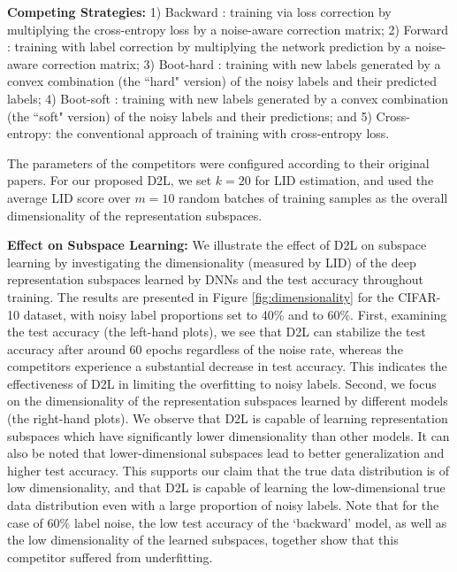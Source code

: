 \documentclass{article}
\begin{document}
\textbf{Competing Strategies:}
1) Backward \cite{patrini2017making}: training via loss correction by multiplying the cross-entropy loss by a noise-aware correction matrix; 2) Forward \cite{patrini2017making}: training with label correction by multiplying the network prediction by a noise-aware correction matrix; 3) Boot-hard \cite{reed2014training}: training with new labels generated by a convex combination (the ``hard" version) of the noisy labels and their predicted labels; 4) Boot-soft \cite{reed2014training}: training with new labels generated by a convex combination (the ``soft" version) of the noisy labels and their predictions; and 5) Cross-entropy: the conventional approach of training with cross-entropy loss.



The parameters of the competitors were configured according to their original papers. For our proposed D2L, we set $k=20$ for LID estimation, and used the average LID score over $m=10$ random batches of training samples as the overall dimensionality of the representation subspaces.




\textbf{Effect on Subspace Learning:}
We illustrate the effect of D2L on subspace learning by investigating the dimensionality (measured by LID) of the deep representation subspaces learned by DNNs and the test accuracy throughout training. The results are presented in Figure \ref{fig:dimensionality} for the CIFAR-10 dataset, with noisy label proportions set to 40\% and to 60\%. First, examining the test accuracy (the left-hand plots), we see that D2L can stabilize the test accuracy after around 60 epochs regardless of the noise rate, whereas the competitors experience a substantial decrease in test accuracy. This indicates the effectiveness of D2L in limiting the overfitting to noisy labels. Second, we focus on the dimensionality of the representation subspaces learned by different models (the right-hand plots). We observe that D2L is capable of learning representation subspaces which have significantly lower dimensionality than other models. It can also be noted that lower-dimensional subspaces lead to better generalization and higher test accuracy. This supports our claim that the true data distribution is of low dimensionality, and that D2L is capable of learning the low-dimensional true data distribution even with a large proportion of noisy labels. Note that for the case of 60\% label noise, the low test accuracy of the `backward' model, as well as the low dimensionality of the learned subspaces, together show that this competitor suffered from underfitting.
\end{document}

